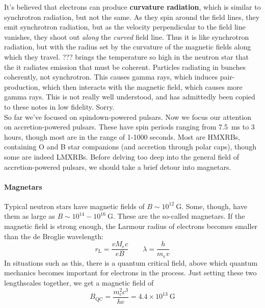 \documentclass[10pt]{article}
\numberwithin{equation}{section}
\newcommand{\n}{\noindent}
\begin{document}
	\n It's believed that electrons can produce \textbf{curvature radiation}, which is similar to synchrotron radiation, but not the same.  As they spin around the field lines, they emit synchrotron radiation, but as the velocity perpendicular to the field line vanishes, they shoot out \emph{along} the \emph{curved} field line. Thus it is like synchrotron radiation, but with the radius set by the curvature of the magnetic fields along which they travel. ??? brings the temperature so high in the neutron star that the it radiates emission that must be coherent. Particles radiating in bunches coherently, not synchrotron. This causes gamma rays, which induces pair-production, which then interacts with the magnetic field, which causes more gamma rays. This is not really well understood, and has admittedly been copied to these notes in low fidelity. Sorry.\\
	
	So far we've focused on spindown-powered pulsars. Now we focus our attention on accretion-powered pulsars. These have spin periods ranging from 7.5\ ms to 3 hours, though most are in the range of 1-1000 seconds. Most are HMXRBs, containing O and B star companions (and accretion through polar caps), though some are indeed LMXRBs. Before delving too deep into the general field of accretion-powered pulsars, we should take a brief detour into magnetars.
	
	\paragraph{Magnetars} %
	\label{par:magnetars}
	Typical neutron stars have magnetic fields of $B\sim 10^{12}\ \mathrm{G}$. Some, though, have them as large as $B\sim 10^{14}-10^{16}\ \mathrm{G}$. These are the so-called magnetars. If the magnetic field is strong enough, the Larmour radius of electrons becomes smaller than the de Broglie wavelength:
	\begin{equation}
		\label{eq:magnetar:1} r_{\mathrm{L}} = \frac{vM_e c}{eB} \qquad \lambda = \frac{h}{m_ev}
	\end{equation}
	In situations such as this, there is a quantum critical field, above which quantum mechanics becomes important for electrons in the process. Just setting these two lengthscales together, we get a magnetic field of
	\begin{equation}
		\label{eq:magnetar:2} B_{\mathrm{QC}} = \frac{m_e^2 c^3}{he} = 4.4\times 10^{13}\ \mathrm{G}
	\end{equation}
\end{document}
